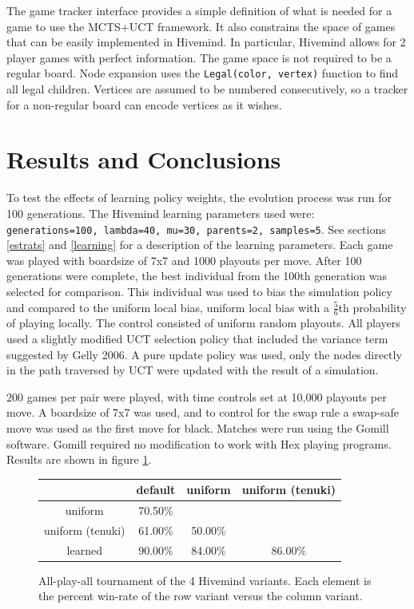 \documentclass[11pt]{report}
\begin{document}
The game tracker interface provides a simple definition of what is needed for a game to use the MCTS+UCT framework. It also constrains the space of games that can be easily implemented in Hivemind. In particular, Hivemind allows for 2 player games with perfect information. The game space is not required to be a regular board. Node expansion uses the \texttt{Legal(color, vertex)} function to find all legal children. Vertices are assumed to be numbered consecutively, so a tracker for a non-regular board can encode vertices as it wishes.

\section{Results and Conclusions}\label{results}
To test the effects of learning policy weights, the evolution process was run for 100 generations. The Hivemind learning parameters used were: \texttt{generations=100, lambda=40, mu=30, parents=2, samples=5}. See sections \ref{estrats} and \ref{learning} for a description of the learning parameters. Each game was played with boardsize of 7x7 and 1000 playouts per move. After 100 generations were complete, the best individual from the 100th generation was selected for comparison. This individual was used to bias the simulation policy and compared to the uniform local bias, uniform local bias with a $\frac{5}{6}$th probability of playing locally. The control consisted of uniform random playouts. All players used a slightly modified UCT selection policy that included the variance term suggested by Gelly 2006\cite{gelly2006exploration}. A pure update policy was used, only the nodes directly in the path traversed by UCT were updated with the result of a simulation.

200 games per pair were played, with time controls set at 10,000 playouts per move. A boardsize of 7x7 was used, and to control for the swap rule a swap-safe move was used as the first move for black. Matches were run using the Gomill software\cite{gomill}. Gomill required no modification to work with Hex playing programs. Results are shown in figure \ref{fig:results}.

\begin{figure}
	\begin{center}
		\begin{tabular}{c | c c c}
		 & default & uniform & uniform (tenuki) \\
		\hline
		uniform & 70.50\% & & \\
		uniform (tenuki) & 61.00\% & 50.00\% & \\
		learned & 90.00\% & 84.00\% & 86.00\% \\
		\end{tabular}
	\caption{All-play-all tournament of the 4 Hivemind variants. Each element is the percent win-rate of the row variant versus the column variant.}
	\label{fig:results}
	\end{center}
\end{figure}
\end{document}
